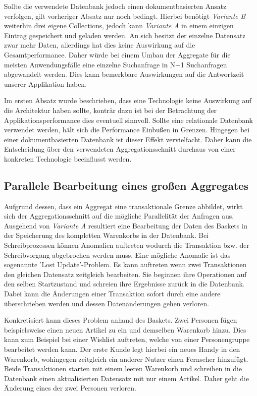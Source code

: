 Sollte die verwendete Datenbank jedoch einen dokumentbasierten Ansatz verfolgen, gilt vorheriger Absatz nur noch bedingt. Hierbei benötigt \emph{Variante B} weiterhin drei eigene Collections, jedoch kann \emph{Variante A} in einem einzigen Eintrag gespeichert und geladen werden. An sich besitzt der einzelne Datensatz zwar mehr Daten, allerdings hat dies keine Auswirkung auf die Gesamtperformance. Daher würde bei einem Umbau der Aggregate für die meisten Anwendungsfälle eine einzelne Suchanfrage in N+1 Suchanfragen abgewandelt werden. Dies kann bemerkbare Auswirkungen auf die Antwortzeit unserer Applikation haben.

Im ersten Absatz wurde beschrieben, dass eine Technologie keine Auswirkung auf die Architektur haben sollte, konträr dazu ist bei der Betrachtung der Applikationsperformance dies eventuell sinnvoll. Sollte eine relationale Datenbank verwendet werden, hält sich die Performance Einbußen in Grenzen. Hingegen bei einer dokumentbasierten Datenbank ist dieser Effekt vervielfacht. Daher kann die Entscheidung über den verwendeten Aggregationsschnitt durchaus von einer konkreten Technologie beeinflusst werden. 


\subsection{Parallele Bearbeitung eines großen Aggregates}
Aufgrund dessen, dass ein Aggregat eine transaktionale Grenze abbildet, wirkt sich der Aggregationsschnitt auf die mögliche Parallelität der Anfragen aus. Ausgehend von \emph{Variante A} resultiert eine Bearbeitung der Daten des Baskets in der Speicherung des kompletten Warenkorbs in der Datenbank. Bei Schreibprozessen können Anomalien auftreten wodurch die Transaktion bzw. der Schreibvorgang abgebrochen werden muss. Eine mögliche Anomalie ist das sogenannte 'Lost Update'-Problem. Es kann auftreten wenn zwei Transaktionen den gleichen Datensatz zeitgleich bearbeiten. Sie beginnen ihre Operationen auf den selben Startzustand und schreien ihre Ergebnisse zurück in die Datenbank. Dabei kann die Änderungen einer Transaktion sofort durch eine andere überschrieben werden und dessen Datenänderungen gehen verloren.

Konkretisiert kann dieses Problem anhand des Baskets. Zwei Personen fügen beispielsweise einen neuen Artikel zu ein und demselben Warenkorb hinzu. Dies kann zum Beispiel bei einer Wishlist auftreten, welche von einer Personengruppe bearbeitet werden kann. Der erste Kunde legt hierbei ein neues Handy in den Warenkorb, wohingegen zeitgleich ein anderer Nutzer einen Fernseher hinzufügt. Beide Transaktionen starten mit einem leeren Warenkorb und schreiben in die Datenbank einen aktualisierten Datensatz mit nur einem Artikel. Daher geht die Änderung eines der zwei Personen verloren. 

